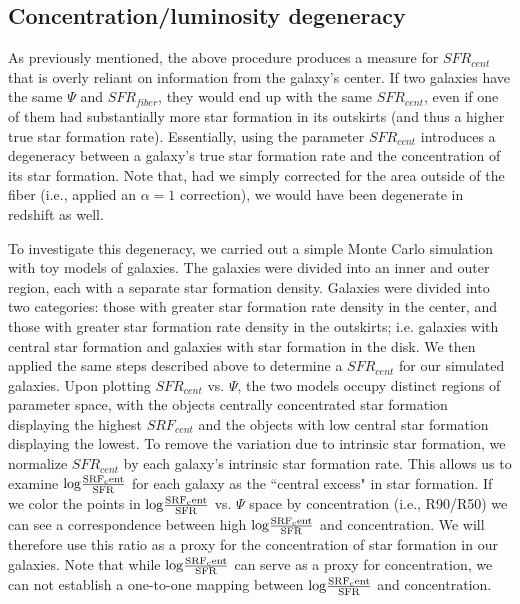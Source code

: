 \documentclass[iop]{emulateapj}
\begin{document}
\subsection{Concentration/luminosity degeneracy}
\label{sec:concdep}
As previously mentioned, the above procedure produces a measure for $SFR_{cent}$ that is overly reliant on information from the galaxy's center. If two galaxies have the same $\Psi$ and $SFR_{fiber}$, they would end up with the same $SFR_{cent}$, even if one of them had substantially more star formation in its outskirts (and thus a higher true star formation rate). Essentially, using the parameter $SFR_{cent}$ introduces a degeneracy between a galaxy's true star formation rate and the concentration of its star formation. Note that, had we simply corrected for the area outside of the fiber (i.e., applied an $\alpha= 1$ correction), we would have been degenerate in redshift as well.

To investigate this degeneracy, we carried out a simple Monte Carlo simulation with toy models of galaxies. The galaxies were divided into an inner and outer region, each with a separate star formation density. Galaxies were divided into two categories: those with greater star formation rate density in the center, and those with greater star formation rate density in the outskirts; i.e. galaxies with central star formation and galaxies with star formation in the disk. We then applied the same steps described above to determine a $SFR_{cent}$ for our simulated galaxies. Upon plotting $SFR_{cent}$ vs. $\Psi$, the two models occupy distinct regions of parameter space, with the objects  centrally concentrated star formation displaying the highest $SRF_{cent}$ and the objects with low central star formation displaying the lowest. To remove the variation due to intrinsic star formation, we normalize $SFR_{cent}$ by each galaxy's intrinsic star formation rate. This allows us to examine $\rm log \frac{SRF_cent}{SFR}$ for each galaxy as the ``central excess" in star formation. If we color the points in $\rm log \frac{SRF_cent}{SFR}$ vs. $\Psi$ space by concentration (i.e., R90/R50) we can see a correspondence between high $\rm log \frac{SRF_cent}{SFR}$ and concentration. We will therefore use this ratio as a proxy for the concentration of star formation in our galaxies. Note that while $\rm log \frac{SRF_cent}{SFR}$ can serve as a proxy for concentration, we can not establish a one-to-one mapping between $\rm log \frac{SRF_cent}{SFR}$ and concentration. 
\end{document}
